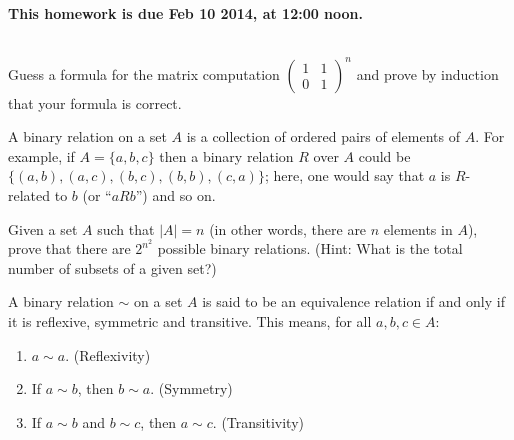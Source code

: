 \documentclass[11pt]{article}
\newif\ifsolutions
\begin{document}
\maketitle

\vspace{0.5em}
{\Large{\textbf{This homework is due Feb 10 2014, at 12:00 noon.}}}


\begin{qunlist}

 \\
Guess a formula for the matrix computation 
$\begin{pmatrix}
1 & 1 \\
0 & 1
\end{pmatrix}^n$ and prove by induction that your formula is correct. 

\ifsolutions
\textbf{Solution:} The guessed formula is
$$\begin{pmatrix}1 & 1\\0 & 1\end{pmatrix}^n = \begin{pmatrix}1 & n\\ 0 & 1\end{pmatrix}$$
Easily checked by induction.
\fi

A binary relation on a set $A$ is a collection of ordered pairs of elements of $A$. For example, if $A = \{a,b,c\}$ then a binary relation $R$ over $A$ could be $\{(a,b),(a,c),(b,c),(b,b),(c,a)\}$; here, one would say that $a$ is $R$-related to $b$ (or ``$aRb$'') and so on.

Given a set $A$ such that $|A| = n$ (in other words, there are $n$ elements in $A$), prove that there are $2^{n^2}$ possible binary relations. (Hint: What is the total number of subsets of a given set?)

\ifsolutions
\textbf{Solution:} The set $A\times A$ is of size $n^2$. The number of subsets it has is therefore $2^{n^2}$.
\fi

  A binary relation $\sim$ on a set $A$ is said to be an equivalence relation if and only if it is reflexive, symmetric and transitive. This means, for all $a,b,c \in A$:

  \begin{enumerate}
  \item
    $a\sim a$. (Reflexivity)
  \item
    If $a\sim b$, then $b\sim a$. (Symmetry)
  \item
    If $a\sim b$ and $b\sim c$, then $a\sim c$. (Transitivity)
  \end{enumerate}


\end{qunlist}
\end{document}
